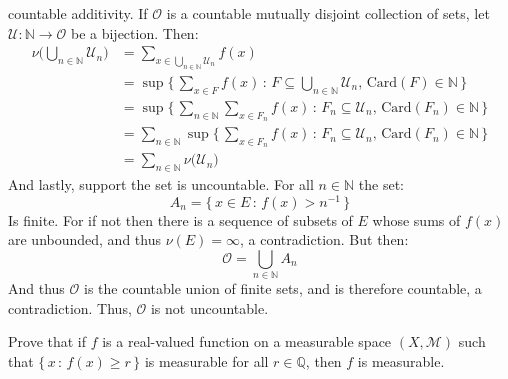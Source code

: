 \documentclass[crop=false,class=article]{standalone}                           %
\begin{document}
\begin{solution}
        countable additivity. If $\mathcal{O}$ is a countable mutually disjoint
        collection of sets, let $\mathcal{U}:\mathbb{N}\rightarrow\mathcal{O}$
        be a bijection. Then:
        \begin{subequations}
            \begin{align}
                \nu\Big(\bigcup_{n\in\mathbb{N}}\mathcal{U}_{n}\Big)
                &=\sum_{x\in\bigcup_{n\in\mathbb{N}}\mathcal{U}_{n}}f(x)\\
                &=\sup\Big\{\,\sum_{x\in{F}}f(x)\,:\,
                    F\subseteq\bigcup_{n\in\mathbb{N}}\mathcal{U}_{n},\,
                    \textrm{Card}(F)\in\mathbb{N}\,\Big\}\\
                &=\sup\Big\{\,\sum_{n\in\mathbb{N}}\sum_{x\in{F}_{n}}f(x)\,:\,
                    F_{n}\subseteq\mathcal{U}_{n},\,
                    \textrm{Card}(F_{n})\in\mathbb{N}\,\Big\}\\
                &=\sum_{n\in\mathbb{N}}
                    \sup\Big\{\,\sum_{x\in{F}_{n}}f(x)\,:\,
                        F_{n}\subseteq\mathcal{U}_{n},\,
                        \textrm{Card}(F_{n})\in\mathbb{N}\,\Big\}\\
                &=\sum_{n\in\mathbb{N}}\nu\big(\mathcal{U}_{n}\big)
            \end{align}
        \end{subequations}
        And lastly, support the set is uncountable. For all $n\in\mathbb{N}$
        the set:
        \begin{equation}
            A_{n}=\{\,x\in{E}\,:\,f(x)>n^{\minus{1}}\,\}
        \end{equation}
        Is finite. For if not then there is a sequence of subsets of $E$ whose
        sums of $f(x)$ are unbounded, and thus $\nu(E)=\infty$, a contradiction.
        But then:
        \begin{equation}
            \mathcal{O}=\bigcup_{n\in\mathbb{N}}A_{n}
        \end{equation}
        And thus $\mathcal{O}$ is the countable union of finite sets, and is
        therefore countable, a contradiction. Thus, $\mathcal{O}$ is not
        uncountable.
    \end{solution}
    \begin{problem}
        Prove that if $f$ is a real-valued function on a measurable space
        $(X,\mathcal{M})$ such that $\{\,x\,:\,f(x)\geq{r}\,\}$ is measurable
        for all $r\in\mathbb{Q}$, then $f$ is measurable.
    \end{problem}
\end{document}
